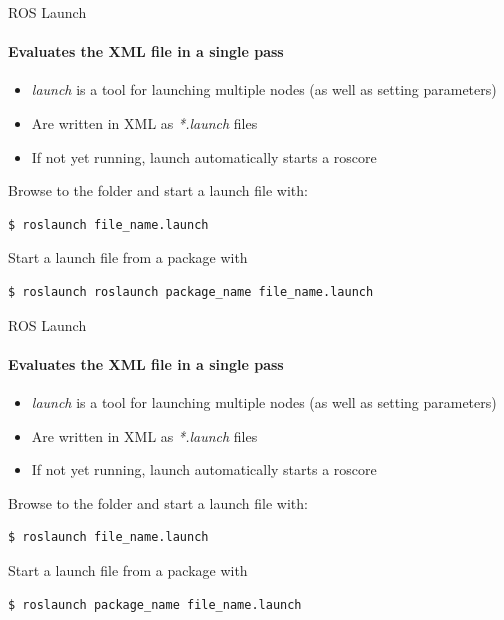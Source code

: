 \documentclass[aspectratio=169]{beamer}
\begin{document}
\begin{frame}[fragile]{ROS Launch}
	\framesubtitle{Evaluates the XML file in a single pass}
	\begin{itemize}
		\item \textit{launch} is a tool for launching multiple nodes (as well as setting parameters)
		\item Are written in XML as \textit{*.launch} files
		\item If not yet running, launch automatically starts a roscore
	\end{itemize}

	Browse to the folder and start a launch file with:
	
	\begin{lstlisting}[language=bash]
		$ roslaunch file_name.launch
	\end{lstlisting}

	Start a launch file from a package with

	\begin{lstlisting}[language=bash]
		$ roslaunch roslaunch package_name file_name.launch
	\end{lstlisting}
\end{frame}

\begin{frame}[fragile]{ROS Launch}
	\framesubtitle{Evaluates the XML file in a single pass}
	\begin{itemize}
		\item \textit{launch} is a tool for launching multiple nodes (as well as setting parameters)
		\item Are written in XML as \textit{*.launch} files
		\item If not yet running, launch automatically starts a roscore
	\end{itemize}

	Browse to the folder and start a launch file with:
	
	\begin{lstlisting}[language=bash]
		$ roslaunch file_name.launch
	\end{lstlisting}

	Start a launch file from a package with

	\begin{lstlisting}[language=bash]
		$ roslaunch package_name file_name.launch
	\end{lstlisting}
\end{frame}
\end{document}
